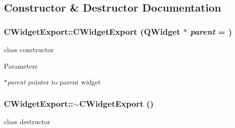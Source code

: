 \subsection{Constructor \& Destructor Documentation}
\hypertarget{classCWidgetExport_a1338e5bf75c7aa778fc5bfb1c2c1fe86}{
\subsubsection[{CWidgetExport}]{\setlength{\rightskip}{0pt plus 5cm}CWidgetExport::CWidgetExport (QWidget $\ast$ {\em parent} = {})}}
\label{classCWidgetExport_a1338e5bf75c7aa778fc5bfb1c2c1fe86}
class constructor


\begin{DoxyParams}{Parameters}
\item[{\em $\ast$parent}]pointer to parent widget \end{DoxyParams}
\hypertarget{classCWidgetExport_aac482b95b68cbac0a338c2b4b3d87b8a}{
\subsubsection[{$\sim$CWidgetExport}]{\setlength{\rightskip}{0pt plus 5cm}CWidgetExport::$\sim$CWidgetExport ()}}
\label{classCWidgetExport_aac482b95b68cbac0a338c2b4b3d87b8a}
class destructor 


